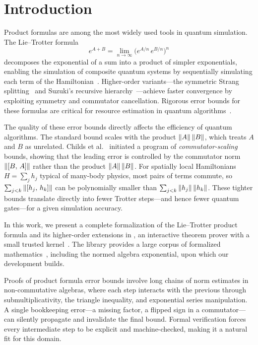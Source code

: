 \section{Introduction}
\label{sec:intro}

Product formulas are among the most widely used tools in quantum simulation.
The Lie--Trotter formula
\begin{equation}\label{eq:lie-trotter}
  e^{A+B} = \lim_{n\to\infty} \bigl(e^{A/n}\,e^{B/n}\bigr)^n
\end{equation}
decomposes the exponential of a sum into a product of simpler exponentials,
enabling the simulation of composite quantum systems by sequentially
simulating each term of the Hamiltonian~\cite{trotter1959product, lloydUniversalQuantumSimulators1996}.
Higher-order variants---the symmetric Strang splitting~\cite{strang1968construction}
and Suzuki's recursive hierarchy~\cite{suzukiGeneralTheoryFractal1991}---achieve
faster convergence by exploiting symmetry and commutator cancellation.
Rigorous error bounds for these formulas are critical for resource estimation
in quantum algorithms~\cite{childsTheoryTrotterError2021}.

The quality of these error bounds directly affects the efficiency of quantum
algorithms.  The standard bound scales with the product $\left\|A\right\|\left\|B\right\|$,
which treats $A$ and $B$ as unrelated.
Childs et al.~\cite{childsTheoryTrotterError2021} initiated a program of
\emph{commutator-scaling} bounds, showing that the leading error is controlled
by the commutator norm $\left\|[B,\,A]\right\|$ rather than the product
$\left\|A\right\|\left\|B\right\|$.
For spatially local Hamiltonians $H = \sum_j h_j$ typical of many-body physics,
most pairs of terms commute, so $\sum_{j<k} \left\|[h_j,\,h_k]\right\|$ can be
polynomially smaller than $\sum_{j<k} \left\|h_j\right\|\left\|h_k\right\|$.
These tighter bounds translate directly into fewer Trotter steps---and hence
fewer quantum gates---for a given simulation accuracy.

In this work, we present a complete formalization of the Lie--Trotter product
formula and its higher-order extensions in \Lean, an interactive theorem prover
with a small trusted kernel~\cite{demoura2021lean4}.
The \Mathlib library provides a large corpus of formalized
mathematics~\cite{mathlib2020}, including the normed algebra exponential,
upon which our development builds.

Proofs of product formula error bounds involve long chains of norm estimates
in non-commutative algebras, where each step interacts with the previous through
submultiplicativity, the triangle inequality, and exponential series manipulation.
A single bookkeeping error---a missing factor, a flipped sign in a
commutator---can silently propagate and invalidate the final bound.
Formal verification forces every intermediate step to be explicit and
machine-checked, making it a natural fit for this domain.

